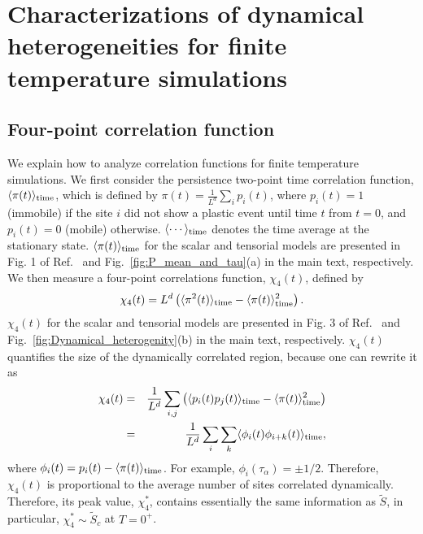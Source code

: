 \documentclass[pre,twocolumn,superscriptaddress,tightenlines,showpacs,longbibliography,floatfix,footinbib]{revtex4-1}
\begin{document}
\section{Characterizations of dynamical heterogeneities for finite temperature simulations}
\label{sec:appendix_finite_T}

\subsection{Four-point correlation function}


We explain how to analyze correlation functions for finite temperature simulations.
We first consider the persistence two-point time correlation function, $\langle \pi(t) \rangle_{\rm time}$, which is defined by $\pi(t) = \frac{1}{L^d} \sum_i p_i(t)$,
where
$p_i(t)=1$ (immobile) if the site $i$ did not show a plastic event until time $t$ from $t=0$, and $p_i(t)=0$ (mobile) otherwise.
$\langle \cdots \rangle_{\rm time}$ denotes the time average at the stationary state.
$\langle \pi(t) \rangle_{\rm time}$ for the scalar and tensorial models are presented in Fig. 1 of Ref.~\cite{ozawa2023elasticity} and Fig.~\ref{fig:P_mean_and_tau}(a) in the main text, respectively.
We then measure a four-point correlations function, $\chi_4(t)$, defined by
\begin{equation}
 \chi_4(t) = L^d \left( \langle \pi^2(t)\rangle_{\rm time} - \langle \pi(t) \rangle_{\rm time}^2 \right).   
\end{equation}
$\chi_4(t)$ for the scalar and tensorial models are presented in Fig. 3 of Ref.~\cite{ozawa2023elasticity} and Fig.~\ref{fig:Dynamical_heterogenity}(b) in the main text, respectively.
$\chi_4(t)$ quantifies the size of the dynamically correlated region, because one can rewrite it as 
\begin{eqnarray}
    \chi_4(t) &=& \frac{1}{L^d} \sum_{i,j} \left( \langle p_i(t)p_j(t) \rangle_{\rm time} - \langle \pi(t)\rangle_{\rm time}^2 \right) \label{eq:chi_4_equation} \\
    &=& \frac{1}{L^d} \sum_i \sum_k \langle \phi_i(t) \phi_{i+k}(t) \rangle_{\rm time},
\end{eqnarray}
where $\phi_i(t)=p_i(t)-\langle \pi(t)\rangle_{\rm time}$. For example, $\phi_i(\tau_\alpha)= \pm 1/2$.
Therefore, $\chi_4(t)$ is proportional to the average number of sites correlated dynamically.
Therefore, its peak value, $\chi_4^*$, contains essentially the same information as $\tilde S$, in particular,  $\chi_4^* \sim \tilde S_c$ at $T=0^+$.
\end{document}

